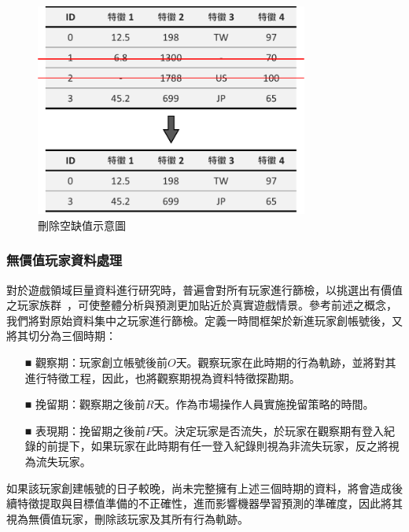 \begin{figure}[!htb]
  \begin{center}
    \includegraphics[width=0.8\textwidth]{figures/Image_MissingValueHandle.png}
    \caption[刪除空缺值示意圖]{刪除空缺值示意圖}
    \label{fig:Image_MissingValueHandle}
  \end{center}
\end{figure}

\subsubsection{無價值玩家資料處理}
\label{subsubsec:NonValuePlayerHandle}

對於遊戲領域巨量資料進行研究時，普遍會對所有玩家進行篩檢，以挑選出有價值之玩家族群~\cite{lee2018game}，可使整體分析與預測更加貼近於真實遊戲情景。參考前述之概念，我們將對原始資料集中之玩家進行篩檢。定義一時間框架於新進玩家創帳號後，又將其切分為三個時期：

\begin{itemize}
  \item [■] 觀察期：玩家創立帳號後前$O$天。觀察玩家在此時期的行為軌跡，並將對其進行特徵工程，因此，也將觀察期視為資料特徵探勘期。
  \item [■] 挽留期：觀察期之後前$R$天。作為市場操作人員實施挽留策略的時間。
  \item [■] 表現期：挽留期之後前$P$天。決定玩家是否流失，於玩家在觀察期有登入紀錄的前提下，如果玩家在此時期有任一登入紀錄則視為非流失玩家，反之將視為流失玩家。
\end{itemize}

如果該玩家創建帳號的日子較晚，尚未完整擁有上述三個時期的資料，將會造成後續特徵提取與目標值準備的不正確性，進而影響機器學習預測的準確度，因此將其視為無價值玩家，刪除該玩家及其所有行為軌跡。

